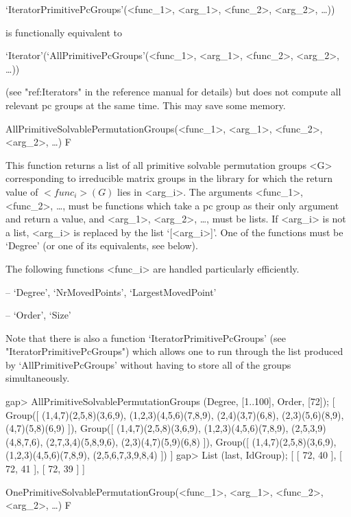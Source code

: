 `IteratorPrimitivePcGroups'(<func_1>, <arg_1>, <func_2>, <arg_2>, \dots)) 

is functionally equivalent to 

`Iterator'(`AllPrimitivePcGroups'(<func_1>, <arg_1>, <func_2>, <arg_2>, \dots))

(see "ref:Iterators" in the {\GAP} reference manual for details) but does not 
compute all relevant pc groups at the same time. 
This may save some memory. 




\>AllPrimitiveSolvablePermutationGroups(<func_1>, <arg_1>, <func_2>, <arg_2>, \dots) F

This function returns a list of all primitive solvable permutation
groups <G> corresponding to irreducible matrix groups in the  {\IRREDSOL} library 
for which the return value of $<func_i>(G)$ lies
in <arg_i>.  The arguments <func_1>, <func_2>, \dots,
must be {\GAP} functions which take a pc group as their only argument and return a
value, and <arg_1>, <arg_2>,
\dots,  must be lists. If <arg_i> is not a list, <arg_i> is replaced by the list
`[<arg_i>]'. One of the functions must be `Degree' (or one of its
equivalents, see below).

The following functions <func_i> are handled particularly efficiently. 

\beginlist

\item{--} `Degree', `NrMovedPoints', `LargestMovedPoint'
\item{--} `Order', `Size'
\endlist

Note that there is also a function `IteratorPrimitivePcGroups' (see
"IteratorPrimitivePcGroups") which allows one to run through the list produced by
`AllPrimitivePcGroups' without having to store all of the groups
simultaneously.

\beginexample
gap> AllPrimitiveSolvablePermutationGroups (Degree, [1..100], Order, [72]);
[ Group([ (1,4,7)(2,5,8)(3,6,9), (1,2,3)(4,5,6)(7,8,9), (2,4)(3,7)(6,8), 
      (2,3)(5,6)(8,9), (4,7)(5,8)(6,9) ]), 
  Group([ (1,4,7)(2,5,8)(3,6,9), (1,2,3)(4,5,6)(7,8,9), (2,5,3,9)(4,8,7,6), 
      (2,7,3,4)(5,8,9,6), (2,3)(4,7)(5,9)(6,8) ]), 
  Group([ (1,4,7)(2,5,8)(3,6,9), (1,2,3)(4,5,6)(7,8,9), (2,5,6,7,3,9,8,4) ]) ]
gap> List (last, IdGroup);
[ [ 72, 40 ], [ 72, 41 ], [ 72, 39 ] ]
\endexample


\>OnePrimitiveSolvablePermutationGroup(<func_1>, <arg_1>, <func_2>, <arg_2>, \dots) F

